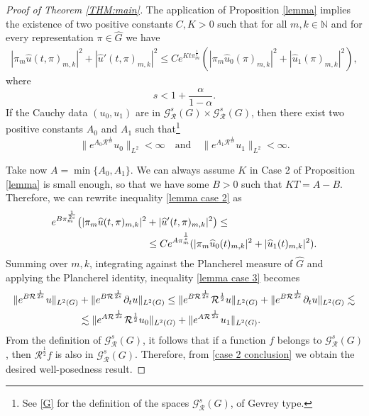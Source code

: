 \documentclass[12pt,oneside,a4paper]{book}
\numberwithin{equation}{section}     %
\theoremstyle{plain}
\theoremstyle{definition}
\newcommand{\N}{{\mathbb N}}
\begin{document}
\begin{proof}[Proof of Theorem \ref{THM:main}]
	The application of Proposition \ref{lemma} implies the existence of two positive constants $C,K>0$ such that for all $m,k\in\N$ and for every representation $\pi\in\widehat G$ we have
	\begin{align}\label{lemma case 2}
	|\pi_m\widehat u (t,\pi)_{m,k}|^2+|\widehat u' (t,\pi)_{m,k}|^2\leq Ce^{Kt\pi_m^{\frac{1}{s}}}(|\pi_m\widehat u_0 (\pi)_{m,k}|^2+|\widehat u_1 (\pi)_{m,k}|^2),
	\end{align} 
	where 
	\[
	s < 1+\frac{\alpha}{1-\alpha}.
	\]
	If the Cauchy data $(u_0, u_1)$ are in $\mathcal G^s_\mathcal R(G)\times \mathcal G^s_\mathcal R(G)$, then there exist two positive constants $A_0$ and $A_1$ such that\footnote{See \eqref{G} for the definition of the spaces $\mathcal{G}^s_\mathcal{R}(G)$, of Gevrey type.}
	\begin{equation*}
	\|e^{A_0\mathcal R^{\frac{1}{2s}}}u_0\|_{L^2}<\infty\quad\text{and}\quad\|e^{A_1\mathcal R^{\frac{1}{2s}}}u_1\|_{L^2}<\infty.
	\end{equation*}
	
	Take now $A=\min\{A_0,A_1\}$. We can always assume $K$ in Case 2 of Proposition \ref{lemma} is small enough, so that we have some $B>0$ such that $KT=A-B$. Therefore, we can rewrite inequality \eqref{lemma case 2} as 
	\begin{align}\notag
	e^{B\pi_m^{\frac{1}{2s}}}\big(|\pi_m\widehat u (t,\pi)_{m,k}|^2&+|\widehat u' (t,\pi)_{m,k}|^2\big)\leq\\\label{lemma case 3}
	&\leq Ce^{A\pi_m^{\frac{1}{s}}}(|\pi_m\widehat u_0 (t)_{m,k}|^2+|\widehat u_1 (t)_{m,k}|^2).
	\end{align}
	Summing over $m,k$, integrating against the Plancherel measure of $\widehat G$ and applying the Plancherel identity, inequality \eqref{lemma case 3} becomes
	\begin{align}\notag
	\|e^{B\mathcal R^{\frac{1}{2s}}}u\|_{L^2(G)}&+\|e^{B\mathcal R^{\frac{1}{2s}}}\partial_tu\|_{L^2(G)}\leq
	\|e^{B\mathcal R^{\frac{1}{2s}}}\mathcal R^{\frac{1}{2}}u\|_{L^2(G)}+\|e^{B\mathcal R^{\frac{1}{2s}}}\partial_tu\|_{L^2(G)}\lesssim\\\label{case 2 conclusion}
	&\lesssim \|e^{A\mathcal R^{\frac{1}{2s}}}\mathcal R^{\frac{1}{2}}u_0\|_{L^2(G)}+\|e^{A\mathcal R^{\frac{1}{2s}}}u_1\|_{L^2(G)}.
	\end{align}
	From the definition of $\mathcal{G}_{\mathcal{R}}^s(G)$, it follows that if a function $f$ belongs to $\mathcal G^s_{\mathcal R}(G)$, then $\mathcal R^\frac{1}{2}f$ is also in $\mathcal G_\mathcal R^s(G)$. Therefore, from \eqref{case 2 conclusion} we obtain the desired well-posedness result.
	

\end{proof}
\end{document}

